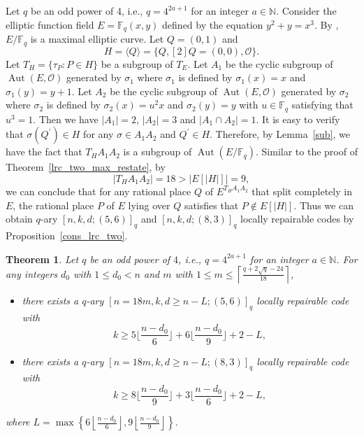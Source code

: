 \documentclass[journal,12pt,onecolumn]{IEEEtran}
\newtheorem{theorem}{Theorem}
\begin{document}
Let \( q \) be an odd power of 4, i.e., \( q = 4^{2a+1} \) for an integer \( a \in \mathbb{N} \). Consider the elliptic function field \( E = \mathbb{F}_q(x, y) \) defined by the equation \( y^2 + y = x^3 \). By \cite[Lem. 15]{Optimal_Locally_Repairable_Codes_Via_Elliptic_Curves}, \( E/\mathbb{F}_q \) is a maximal elliptic curve. Let \( Q = (0, 1) \) and 
\[
    H = \langle Q\rangle = \{Q,[2]Q = (0,0),\mathcal{O}\}. 
\]
Let \( T_H = \{\tau_P:P\in H\} \) be a subgroup of \( T_E \). Let \(A_1\) be the cyclic subgroup of \(\operatorname{Aut}(E, \mathcal{O})\) generated by \(\sigma_1\) where \(\sigma_1\) is defined by \(\sigma_1(x) = x\) and \(\sigma_1(y) = y+1\). Let \(A_2\) be the cyclic subgroup of \(\operatorname{Aut}(E, \mathcal{O})\) generated by \(\sigma_2\) where \(\sigma_2\) is defined by \(\sigma_2(x) = u^2x\) and \(\sigma_2(y) = y\) with \(u\in\mathbb{F}_q\) satisfying that \(u^3 = 1\). Then we have \(|A_1| = 2\), \(|A_2|  = 3\) and \(|A_1\cap A_2| = 1\). It is easy to verify that \(\sigma(Q^\prime)\in H\) for any \(\sigma\in A_1A_2\) and \(Q^\prime\in H\). Therefore, by Lemma~\ref{sub}, we have the fact that \(T_HA_1A_2\) is a subgroup of \( \operatorname{Aut}(E/\mathbb{F}_q) \). Similar to the proof of Theorem~\ref{lrc_two_max_restate}, by
\[
    |T_HA_1A_2| = 18>|E[|H|]|=9,
\]
we can conclude that for any rational place \(Q\) of \( E^{T_HA_1A_2} \) that split completely in \( E \), the rational place $P$ of $E$ lying over $Q$ satisfies that \(P\notin E[|H|]\). Thus we can obtain \(q\)-ary \([n, k, d;(5,6)]_q\) and \([n, k, d;(8,3)]_q\) locally repairable codes by Proposition~\ref{cons_lrc_two}. 

\begin{theorem}\label{lrc_two_F2}
    Let \( q \) be an odd power of \( 4 \), i.e., \( q = 4^{2a+1} \) for an integer \( a \in \mathbb{N} \). For any integers \( d_0 \) with \( 1 \leq d_0 < n \) and \( m \) with \(1 \leq m \leq \left\lceil \frac{q+2\sqrt{q}-24}{18} \right\rceil\),  
    \begin{itemize}
        \item[(i)] there exists a \( q \)-ary \([n = 18m, k, d\ge n - L;(5,6)]_{q}\) locally repairable code with 
        \[
            k \geq 5\bigg\lfloor\frac{n-d_0}{6}\bigg\rfloor + 6\bigg\lfloor\frac{n-d_0}{9}\bigg\rfloor  + 2 - L, 
        \]
        \item[(ii)] there exists a \( q \)-ary \([n = 18m, k, d\ge n - L;(8,3)]_{q}\) locally repairable code with 
        \[
            k \geq 8\bigg\lfloor\frac{n-d_0}{9}\bigg\rfloor + 3\bigg\lfloor\frac{n-d_0}{6}\bigg\rfloor  + 2 - L,
        \]
    \end{itemize}
    where \(L = \max\left\{6\left\lfloor\frac{n-d_0}{6}\right\rfloor,9\left\lfloor\frac{n-d_0}{9}\right\rfloor\right\}\). 
\end{theorem}
\end{document}
